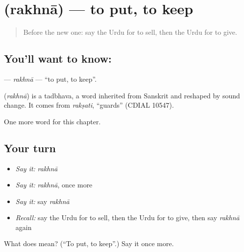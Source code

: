 \section[\texorpdfstring{\ur{رکھنا} (rakhnā)}{رکھنا (rakhnā)}]{ (rakhnā) — to put, to keep}

\label{lesson:UR-C48-rakhna}



\begin{quote}
Before the new one: say the Urdu for to sell, then the Urdu for to give.
\end{quote}

\subsection*{You'll want to know: }
\textbf{} — \emph{rakhnā} — \textquotedblleft{}to put, to keep\textquotedblright{}.

\begin{cousinweb}
\textbf{} (\emph{rakhnā}) is a tadbhava, a word inherited from Sanskrit and reshaped by sound change. It comes from \emph{rakṣati}, \textquotedblleft{}guards\textquotedblright{} (CDIAL 10547).
\end{cousinweb}

\begin{grammarlens}[title={What you've built}]
One more word for this chapter.
\end{grammarlens}

\subsection*{Your turn}
\begin{itemize}
\raggedright
  \item \emph{Say it:} \emph{rakhnā}
  \item \emph{Say it:} \emph{rakhnā}, once more
  \item \emph{Say it:} say \emph{rakhnā}
  \item \emph{Recall:} say the Urdu for to sell, then the Urdu for to give, then say \emph{rakhnā} again
\end{itemize}

\begin{tcolorbox}[breakable,colback=teal!4,colframe=teal!35!black,title={Before you move on}]
What does  mean? (\textquotedblleft{}To put, to keep\textquotedblright{}.) Say it once more.
\end{tcolorbox}
